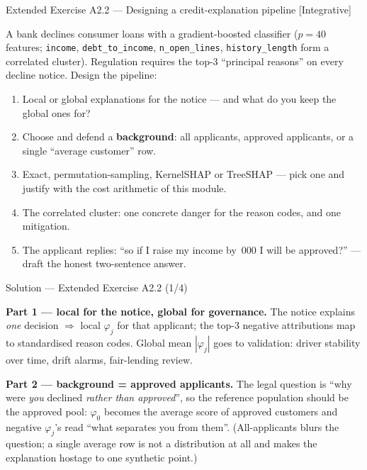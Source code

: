 \documentclass[aspectratio=169,11pt]{beamer}
\begin{document}
\begin{frame}{Extended Exercise A2.2 --- Designing a credit-explanation pipeline [Integrative]}
\begin{longexercise}
  A bank declines consumer loans with a gradient-boosted classifier
  ($p=40$ features; \texttt{income}, \texttt{debt\_to\_income},
  \texttt{n\_open\_lines}, \texttt{history\_length} form a correlated cluster).
  Regulation requires the top-3 ``principal reasons'' on every decline notice.
  Design the pipeline:
  \begin{enumerate}
    \item Local or global explanations for the notice --- and what do you keep the
          global ones for?
    \item Choose and defend a \textbf{background}: all applicants, approved
          applicants, or a single ``average customer'' row.
    \item Exact, permutation-sampling, KernelSHAP or TreeSHAP --- pick one and
          justify with the cost arithmetic of this module.
    \item The correlated cluster: one concrete danger for the reason codes, and
          one mitigation.
    \item The applicant replies: ``so if I raise my income by \,000 I
          will be approved?'' --- draft the honest two-sentence answer.
  \end{enumerate}
\end{longexercise}
\end{frame}

\begin{frame}{Solution --- Extended Exercise A2.2 (1/4)}
\begin{solutionbox}
  \textbf{Part 1 --- local for the notice, global for governance.} The notice
  explains \emph{one} decision $\Rightarrow$ local $\varphi_j$ for that applicant;
  the top-3 negative attributions map to standardised reason codes. Global mean
  $|\varphi_j|$ goes to validation: driver stability over time, drift alarms,
  fair-lending review.

  \smallskip
  \textbf{Part 2 --- background = approved applicants.} The legal question is
  ``why were \emph{you} declined \emph{rather than approved}'', so the reference
  population should be the approved pool: $\varphi_0$ becomes the average score of
  approved customers and negative $\varphi_j$'s read ``what separates you from
  them''. (All-applicants blurs the question; a single average row is not a
  distribution at all and makes the explanation hostage to one synthetic point.)
\end{solutionbox}
\end{frame}
\end{document}
